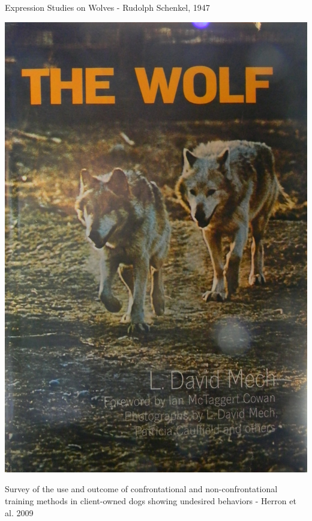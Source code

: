 \documentclass{beamer}
\begin{document}
    \begin{frame}
        \centering
        \Huge
        Expression Studies on Wolves - Rudolph Schenkel, 1947
    \end{frame}

    \begin{frame}
        \centering
        \includegraphics[height=.95\textheight]{static/mech_the_wolf.jpg}
    \end{frame}

    \begin{frame}
        \centering
        \Large
Survey of the use and outcome of confrontational and non-confrontational
training methods in client-owned dogs showing undesired behaviors - Herron et al.
2009
    \end{frame}
\end{document}
